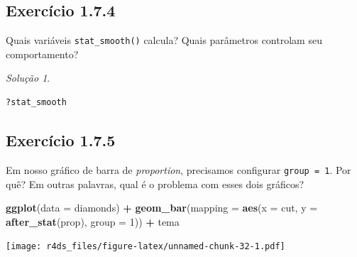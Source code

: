\documentclass[
]{latex/krantz}
\newenvironment{Shaded}{\begin{snugshade}}{\end{snugshade}}
\newcommand{\AttributeTok}[1]{\textcolor[rgb]{0.13,0.29,0.53}{#1}}
\newcommand{\DecValTok}[1]{\textcolor[rgb]{0.00,0.00,0.81}{#1}}
\newcommand{\FunctionTok}[1]{\textcolor[rgb]{0.13,0.29,0.53}{\textbf{#1}}}
\newcommand{\NormalTok}[1]{#1}
\newcommand{\SpecialCharTok}[1]{\textcolor[rgb]{0.81,0.36,0.00}{\textbf{#1}}}
\theoremstyle{definition}
\theoremstyle{definition}
\theoremstyle{definition}
\theoremstyle{definition}
\theoremstyle{remark}
\newtheorem*{solution}{Solução}
\begin{document}
\hypertarget{exr1-7-4}{%
\subsection*{Exercício 1.7.4}\label{exr1-7-4}}

Quais variáveis \texttt{stat\_smooth()} calcula? Quais parâmetros controlam seu comportamento?

\begin{solution}
\leavevmode

\begin{verbatim}
?stat_smooth
\end{verbatim}

\end{solution}

\hypertarget{exr1-7-5}{%
\subsection*{Exercício 1.7.5}\label{exr1-7-5}}

Em nosso gráfico de barra de \emph{proportion}, precisamos configurar \texttt{group\ =\ 1}. Por quê? Em outras palavras, qual é o problema com esses dois gráficos?

\begin{Shaded}
\begin{Highlighting}[]
\FunctionTok{ggplot}\NormalTok{(}\AttributeTok{data =}\NormalTok{ diamonds) }\SpecialCharTok{+}
    \FunctionTok{geom\_bar}\NormalTok{(}\AttributeTok{mapping =} \FunctionTok{aes}\NormalTok{(}\AttributeTok{x =}\NormalTok{ cut, }\AttributeTok{y =} \FunctionTok{after\_stat}\NormalTok{(prop), }\AttributeTok{group =} \DecValTok{1}\NormalTok{)) }\SpecialCharTok{+}
\NormalTok{    tema}
\end{Highlighting}
\end{Shaded}

\texttt{[image: r4ds\_files/figure-latex/unnamed-chunk-32-1.pdf]}
\end{document}
